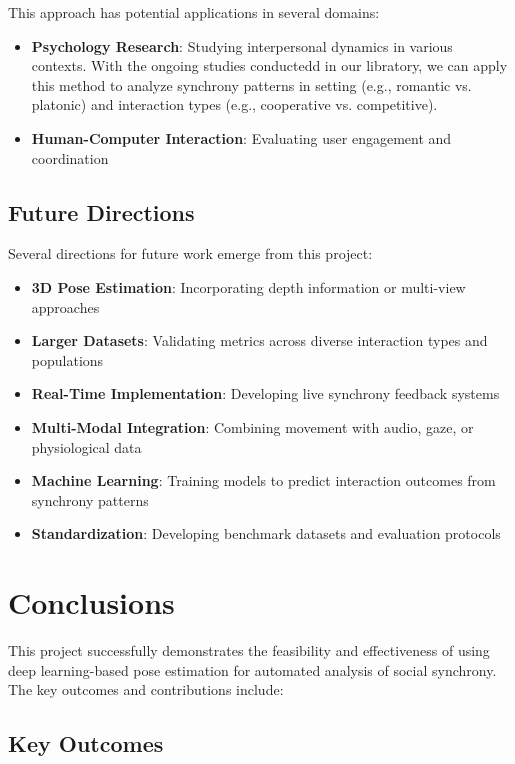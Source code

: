 \documentclass[11pt]{article}
\begin{document}
This approach has potential applications in several domains:

\begin{itemize}
    \item \textbf{Psychology Research}: Studying interpersonal dynamics in various contexts. With the ongoing studies conductedd in our libratory, we can apply this method to analyze synchrony patterns in setting (e.g., romantic vs. platonic) and interaction types (e.g., cooperative vs. competitive).
    \item \textbf{Human-Computer Interaction}: Evaluating user engagement and coordination
\end{itemize}

\subsection{Future Directions}

Several directions for future work emerge from this project:

\begin{itemize}
    \item \textbf{3D Pose Estimation}: Incorporating depth information or multi-view approaches
    \item \textbf{Larger Datasets}: Validating metrics across diverse interaction types and populations
    \item \textbf{Real-Time Implementation}: Developing live synchrony feedback systems
    \item \textbf{Multi-Modal Integration}: Combining movement with audio, gaze, or physiological data
    \item \textbf{Machine Learning}: Training models to predict interaction outcomes from synchrony patterns
    \item \textbf{Standardization}: Developing benchmark datasets and evaluation protocols
\end{itemize}

\section{Conclusions}

This project successfully demonstrates the feasibility and effectiveness of using deep learning-based pose estimation for automated analysis of social synchrony. The key outcomes and contributions include:

\subsection{Key Outcomes}
\end{document}
